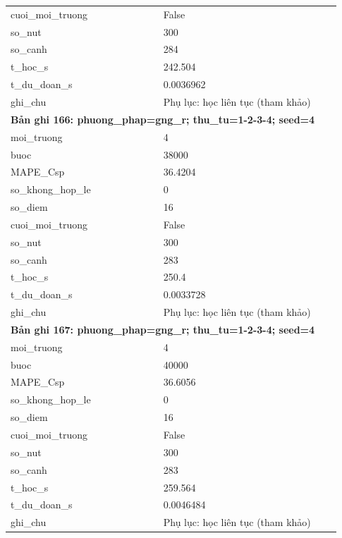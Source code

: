 \begin{longtable}{p{0.43\linewidth}p{0.50\linewidth}}
cuoi\_\allowbreak moi\_\allowbreak truong & False \\
so\_\allowbreak nut & 300 \\
so\_\allowbreak canh & 284 \\
t\_\allowbreak hoc\_\allowbreak s & 242.504 \\
t\_\allowbreak du\_\allowbreak doan\_\allowbreak s & 0.0036962 \\
ghi\_\allowbreak chu & Phụ lục: học liên tục (tham khảo) \\
\midrule
\multicolumn{2}{p{0.95\linewidth}}{\textbf{Bản ghi 166: phuong\_phap=gng\_r; thu\_tu=1-2-3-4; seed=4}} \\
moi\_\allowbreak truong & 4 \\
buoc & 38000 \\
MAPE\_\allowbreak Csp & 36.4204 \\
so\_\allowbreak khong\_\allowbreak hop\_\allowbreak le & 0 \\
so\_\allowbreak diem & 16 \\
cuoi\_\allowbreak moi\_\allowbreak truong & False \\
so\_\allowbreak nut & 300 \\
so\_\allowbreak canh & 283 \\
t\_\allowbreak hoc\_\allowbreak s & 250.4 \\
t\_\allowbreak du\_\allowbreak doan\_\allowbreak s & 0.0033728 \\
ghi\_\allowbreak chu & Phụ lục: học liên tục (tham khảo) \\
\midrule
\multicolumn{2}{p{0.95\linewidth}}{\textbf{Bản ghi 167: phuong\_phap=gng\_r; thu\_tu=1-2-3-4; seed=4}} \\
moi\_\allowbreak truong & 4 \\
buoc & 40000 \\
MAPE\_\allowbreak Csp & 36.6056 \\
so\_\allowbreak khong\_\allowbreak hop\_\allowbreak le & 0 \\
so\_\allowbreak diem & 16 \\
cuoi\_\allowbreak moi\_\allowbreak truong & False \\
so\_\allowbreak nut & 300 \\
so\_\allowbreak canh & 283 \\
t\_\allowbreak hoc\_\allowbreak s & 259.564 \\
t\_\allowbreak du\_\allowbreak doan\_\allowbreak s & 0.0046484 \\
ghi\_\allowbreak chu & Phụ lục: học liên tục (tham khảo) \\

\end{longtable}
